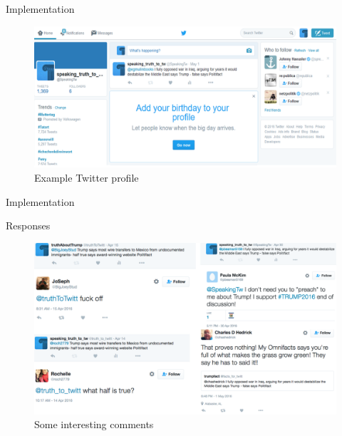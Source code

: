 \documentclass[10pt]{beamer}\usepackage[]{graphicx}\usepackage[]{color}
\begin{document}
\begin{frame}{Implementation}
		\begin{figure}
			\begin{centering}
  	\includegraphics[scale=.45]{twitter_page.PNG}
  \caption{Example Twitter profile}
  \label{fig:twit_prof}
			\end{centering}
		\end{figure}
\end{frame}


\begin{frame}{Implementation}
\begin{table}
		\begin{center}
	{\raggedleft\tiny
	
	}
	\end{center}
\end{table}	

\end{frame}

\begin{frame}{Responses}
		\begin{figure}
			\begin{centering}
  	\includegraphics[scale=.45]{twitter_comment.PNG}
  \caption{Some interesting comments}
			\end{centering}
		\end{figure}
\end{frame}
\end{document}
